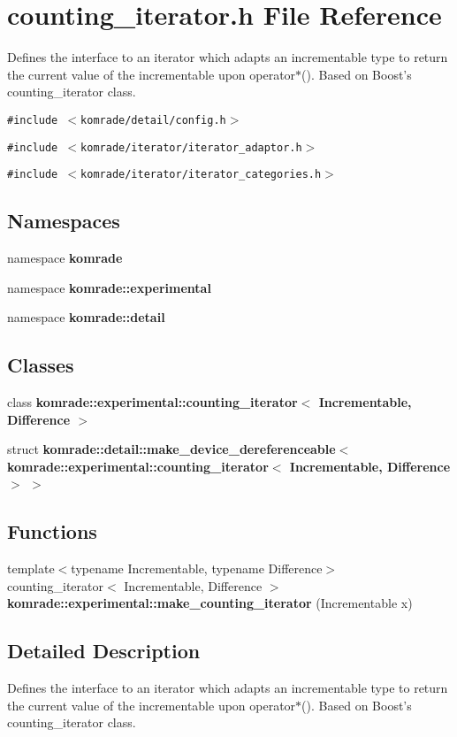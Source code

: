 \section{counting\_\-iterator.h File Reference}
\label{counting__iterator_8h}
Defines the interface to an iterator which adapts an incrementable type to return the current value of the incrementable upon operator$\ast$(). Based on Boost's counting\_\-iterator class. 

{\tt \#include $<$komrade/detail/config.h$>$}\par
{\tt \#include $<$komrade/iterator/iterator\_\-adaptor.h$>$}\par
{\tt \#include $<$komrade/iterator/iterator\_\-categories.h$>$}\par
\subsection*{Namespaces}
\begin{CompactItemize}
\item 
namespace {\bf komrade}
\item 
namespace {\bf komrade::experimental}
\item 
namespace \textbf{komrade::detail}
\end{CompactItemize}
\subsection*{Classes}
\begin{CompactItemize}
\item 
class \textbf{komrade::experimental::counting\_\-iterator$<$ Incrementable, Difference $>$}
\item 
struct \textbf{komrade::detail::make\_\-device\_\-dereferenceable$<$ komrade::experimental::counting\_\-iterator$<$ Incrementable, Difference $>$ $>$}
\end{CompactItemize}
\subsection*{Functions}
\begin{CompactItemize}
\item 
{\footnotesize template$<$typename Incrementable, typename Difference$>$ }\\counting\_\-iterator$<$ Incrementable, Difference $>$ \textbf{komrade::experimental::make\_\-counting\_\-iterator} (Incrementable x)\label{namespacekomrade_1_1experimental_6b2d1b48130fda953643ec1914b0784a}

\end{CompactItemize}


\subsection{Detailed Description}
Defines the interface to an iterator which adapts an incrementable type to return the current value of the incrementable upon operator$\ast$(). Based on Boost's counting\_\-iterator class. 

